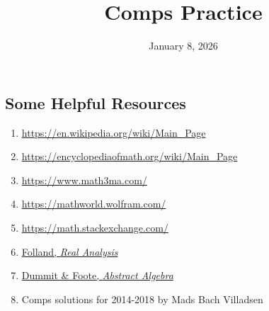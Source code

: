 \documentclass{article}
\title{Comps Practice}
\author{\me}
\date{January 8, 2026}
\begin{document}
	\maketitle
	\fullline 
	\tableofcontents
	\halfline 
	\newpage 

\subsection{Some Helpful Resources}
\begin{enumerate}[itemsep =-2pt,label = (\arabic{*})]
	\item \href{https://en.wikipedia.org/wiki/Main\_Page}{https://en.wikipedia.org/wiki/Main\_Page}
	\item \href{https://encyclopediaofmath.org/wiki/Main\_Page}{https://encyclopediaofmath.org/wiki/Main\_Page}
	\item \href{https://www.math3ma.com/}{https://www.math3ma.com/}
	\item \href{https://mathworld.wolfram.com/}{https://mathworld.wolfram.com/}
	\item \href{https://math.stackexchange.com/}{https://math.stackexchange.com/}
	\item \href{https://www.amazon.com/Real-Analysis-Modern-Techniques-Applications/dp/0471317160}{Folland, \textit{Real Analysis}}
	\item \href{https://www.amazon.com/Abstract-Algebra-3rd-David-Dummit/dp/0471433349/ref=sr\_1\_1?crid=2QCEP6X7QBOXZ\&dib=eyJ2IjoiMSJ9.4lpFqXqi4gfno3aacXf0MjatThq5tLEJhAp-fh-ZjoEcpVe6BepfcaakfakkUP11RZ0suA8TjaFWP839kuylJN6HFv0BVFTsPnjGhtLspwbcq18NH\_QG7IPgfLW09sHPIP89\_aZC4YkgtkH8VF4ti3-uwBq2qtNHbb7urgKZAOSRB9HHcJ0TmqsqzWqhb-RqqMi48Npdgh9Xa15HMlw95FCH67WPMr9zUPn9DyEZhAA.58K0BCGVFKYHckU-lNQ\_Xjh1YVuOBflo8ho9tPPGUqo\&dib\_tag=se\&keywords=dummit+and+foote\%2C+abstract+algebra+3rd+edition\&qid=1768622868\&sprefix=dummit+and+foot\%2Caps\%2C124\&sr=8-1}{Dummit \& Foote, \textit{Abstract Algebra}}
	\item Comps solutions for 2014-2018 by Mads Bach Villadsen
\end{enumerate}

\newpage 
\end{document}

